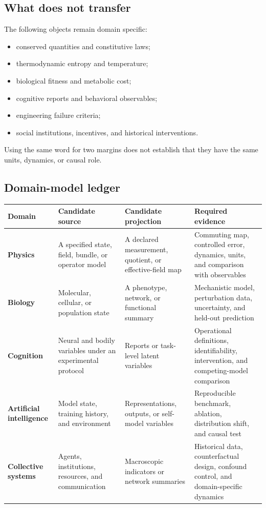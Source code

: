 \documentclass[11pt]{article}
\begin{document}
\subsection{What does not transfer}

The following objects remain domain specific:
\begin{itemize}
\item conserved quantities and constitutive laws;
\item thermodynamic entropy and temperature;
\item biological fitness and metabolic cost;
\item cognitive reports and behavioral observables;
\item engineering failure criteria;
\item social institutions, incentives, and historical interventions.
\end{itemize}
Using the same word for two margins does not establish that they have the
same units, dynamics, or causal role.

\subsection{Domain-model ledger}

\begin{center}
\small
\begingroup
\renewcommand{\arraystretch}{1.10}
\begin{tabularx}{\textwidth}{>{\raggedright\arraybackslash\bfseries}p{}>{\raggedright\arraybackslash}p{}>{\raggedright\arraybackslash}p{}>{\raggedright\arraybackslash}X}
\toprule
Domain & Candidate source & Candidate projection & Required evidence \\
\midrule
Physics & A specified state, field, bundle, or operator model & A declared
measurement, quotient, or effective-field map & Commuting map, controlled
error, dynamics, units, and comparison with observables \\
Biology & Molecular, cellular, or population state & A phenotype, network,
or functional summary & Mechanistic model, perturbation data, uncertainty,
and held-out prediction \\
Cognition & Neural and bodily variables under an experimental protocol &
Reports or task-level latent variables & Operational definitions,
identifiability, intervention, and competing-model comparison \\
Artificial intelligence & Model state, training history, and environment &
Representations, outputs, or self-model variables & Reproducible benchmark,
ablation, distribution shift, and causal test \\
Collective systems & Agents, institutions, resources, and communication &
Macroscopic indicators or network summaries & Historical data,
counterfactual design, confound control, and domain-specific dynamics \\
\bottomrule
\end{tabularx}
\endgroup
\end{center}
\end{document}
